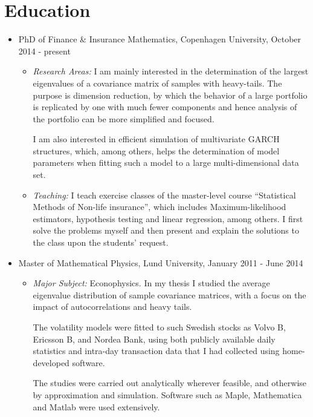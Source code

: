 \documentclass[10pt,letterpaper]{article}
\begin{document}
\section*{Education}
\begin{itemize}
\item PhD of Finance \& Insurance Mathematics, Copenhagen University,
  October 2014 - present
  \begin{itemize}
    \item {\it Research Areas:} I am mainly interested in the
      determination of the largest eigenvalues of a covariance matrix
      of samples with heavy-tails. The purpose is dimension
      reduction, by which the behavior of a large portfolio is
      replicated by one with much fewer components and hence analysis of
      the portfolio can be more simplified and focused.

      I am also interested in efficient simulation of multivariate
      GARCH structures, which, among others, helps the determination of
      model parameters when fitting such a model to a large
      multi-dimensional data set.

      \item{\it Teaching:} I teach exercise classes of the
        master-level course ``Statistical Methods of Non-life
        insurance'', which includes Maximum-likelihood estimators,
        hypothesis testing and linear regression, among others. I
        first solve the problems myself and then present and explain the
        solutions to the class upon the students' request.

  \end{itemize}  

\item Master of Mathematical Physics, Lund University, January 2011 -
  June 2014
  \begin{itemize}
  \item {\it Major Subject:} Econophysics. In my thesis I studied the
    average eigenvalue distribution of sample covariance matrices,
    with a focus on the impact of autocorrelations and heavy tails.

    The volatility models were fitted to such Swedish stocks as Volvo B,
    Ericsson B, and Nordea Bank, using both publicly available daily
    statistics and intra-day transaction data that I had collected
    using home-developed software.

    The studies were carried out analytically wherever feasible, and
    otherwise by approximation and simulation. Software such as Maple,
    Mathematica and Matlab were used extensively.
  \end{itemize}


\end{itemize}
\end{document}
